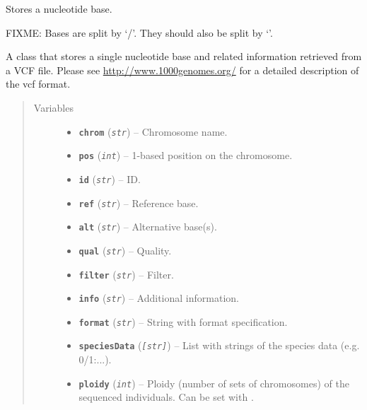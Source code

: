 \documentclass[letterpaper,10pt,english]{sphinxmanual}
\begin{document}
\begin{fulllineitems}
\label{vcf:libPoMo.vcf.NucBase}
Stores a nucleotide base.

FIXME: Bases are split by `/'.  They should also be split by `\textbar{}'.

A class that stores a single nucleotide base and related
information retrieved from a VCF file.  Please see
\url{http://www.1000genomes.org/} for a detailed description of the vcf
format.
\begin{quote}\begin{description}
\item[{Variables}] \leavevmode\begin{itemize}
\item {} 
\textbf{\texttt{chrom}} (\emph{\texttt{str}}) -- Chromosome name.

\item {} 
\textbf{\texttt{pos}} (\emph{\texttt{int}}) -- 1-based position on the chromosome.

\item {} 
\textbf{\texttt{id}} (\emph{\texttt{str}}) -- ID.

\item {} 
\textbf{\texttt{ref}} (\emph{\texttt{str}}) -- Reference base.

\item {} 
\textbf{\texttt{alt}} (\emph{\texttt{str}}) -- Alternative base(s).

\item {} 
\textbf{\texttt{qual}} (\emph{\texttt{str}}) -- Quality.

\item {} 
\textbf{\texttt{filter}} (\emph{\texttt{str}}) -- Filter.

\item {} 
\textbf{\texttt{info}} (\emph{\texttt{str}}) -- Additional information.

\item {} 
\textbf{\texttt{format}} (\emph{\texttt{str}}) -- String with format specification.

\item {} 
\textbf{\texttt{speciesData}} (\emph{\texttt{{[}str{]}}}) -- List with strings of the species data
(e.g. 0/1:...).

\item {} 
\textbf{\texttt{ploidy}} (\emph{\texttt{int}}) -- Ploidy (number of sets of chromosomes) of the
sequenced individuals. Can be set with
{\hyperref[vcf:libPoMo.vcf.NucBase.set_ploidy]{}}.


\end{itemize}
\end{description}
\end{quote}
\end{fulllineitems}
\end{document}
